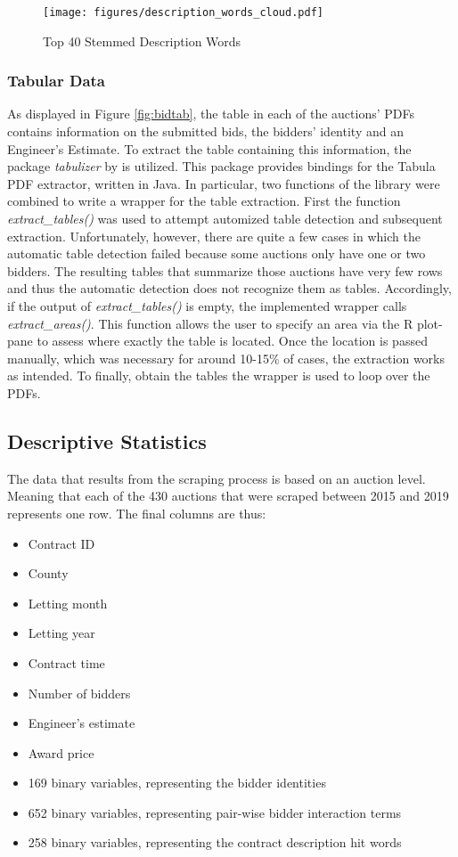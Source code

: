 \documentclass[a4paper,12pt, headsepline]{scrartcl}
\numberwithin{equation}{section}
\begin{document}
\begin{figure}[H]
	\texttt{[image: figures/description\_words\_cloud.pdf]}
	\caption{Top 40 Stemmed Description Words}\label{fig:desc}
\end{figure}

\subsubsection{Tabular Data}\label{subsec:tab}

As displayed in Figure \ref{fig:bidtab}, the table in each of the auctions' PDFs contains information on the submitted bids, the bidders' identity and an Engineer's Estimate. To extract the table containing this information, the package \textit{tabulizer} by \citet{tabulizer} is utilized. This package provides bindings for the Tabula PDF extractor, written in Java. In particular, two functions of the library were combined to write a wrapper for the table extraction. First the function \textit{extract\_tables()} was used to attempt automized table detection and subsequent extraction. Unfortunately, however, there are quite a few cases in which the automatic table detection failed because some auctions only have one or two bidders. The resulting tables that summarize those auctions have very few rows and thus the automatic detection does not recognize them as tables. Accordingly, if the output of \textit{extract\_tables()} is empty, the implemented wrapper calls \textit{extract\_areas()}. This function allows the user to specify an area via the R plot-pane to assess where exactly the table is located. Once the location is passed manually, which was necessary for around 10-15\% of cases, the extraction works as intended. To finally, obtain the tables the wrapper is used to loop over the PDFs.

\subsection{Descriptive Statistics}\label{subsec:desc}
The data that results from the scraping process is based on an auction level. Meaning that each of the 430 auctions that were scraped between 2015 and 2019 represents one row. The final columns are thus:

\begin{itemize}
	\item Contract ID
	\item County
	\item Letting month
	\item Letting year
	\item Contract time
	\item Number of bidders
	\item Engineer's estimate
	\item Award price
	\item 169 binary variables, representing the bidder identities
	\item 652 binary variables, representing pair-wise bidder interaction terms 
	\item 258 binary variables, representing the contract description hit words
\end{itemize}
\end{document}
